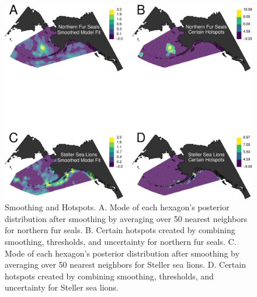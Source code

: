 \documentclass[11pt, titlepage]{article}
\begin{document}
\begin{spacing}{1.9}
\begin{flushleft}
\begin{figure}[H]
  \begin{center}
  \includegraphics[width=1\linewidth]{Fig-SmooHotSpots}
  \end{center}
  \caption{Smoothing and Hotspots. A. Mode of each hexagon's posterior distribution after smoothing by averaging over 50 nearest neighbors for northern fur seals. B. Certain hotspots created by combining smoothing, thresholds, and uncertainty for northern fur seals. C. Mode of each hexagon's posterior distribution after smoothing by averaging over 50 nearest neighbors for Steller sea lions. D. Certain hotspots created by combining smoothing, thresholds, and uncertainty for Steller sea lions. \label{Fig-SmooHotSpots}}         
\end{figure} 




\end{flushleft}
\end{spacing}
\end{document}
